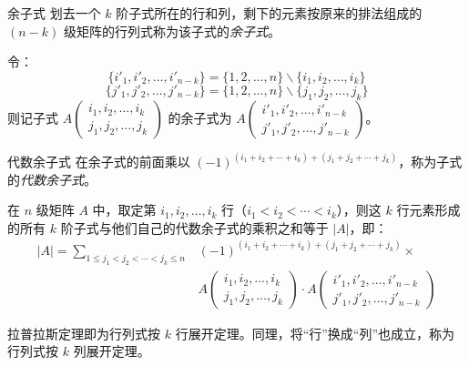\begin{definition}{余子式}
	划去一个 $k$ 阶子式所在的行和列，剩下的元素按原来的排法组成的 $(n - k)$ 级矩阵的行列式称为该子式的\emph{余子式}。

	令：
	$$
	\{ i'_1, i'_2, \ldots, i'_{n - k} \} = \{ 1, 2, \ldots, n \} \backslash \{ i_1, i_2, \ldots, i_k \}
	$$$$
	\{ j'_1, j'_2, \ldots, j'_{n - k} \} = \{ 1, 2, \ldots, n \} \backslash \{ j_1, j_2, \ldots, j_k \}
	$$
	则记子式 $A \begin{pmatrix} i_1, i_2, \ldots, i_k \\ j_1, j_2, \ldots, j_k \end{pmatrix}$ 的余子式为 $A \begin{pmatrix} i'_1, i'_2, \ldots, i'_{n - k} \\ j'_1, j'_2, \ldots, j'_{n - k} \end{pmatrix}$。
\end{definition}

\begin{definition}{代数余子式}
	在余子式的前面乘以 $(-1)^{(i_1 + i_2 + \cdots + i_k) + (j_1 + j_2 + \cdots + j_k)}$，称为子式的\emph{代数余子式}。
\end{definition}

\begin{theorem}[拉普拉斯定理]
	在 $n$ 级矩阵 $A$ 中，取定第 $i_1, i_2, \ldots, i_k$ 行（$i_1 < i_2 < \cdots < i_k$），则这 $k$ 行元素形成的所有 $k$ 阶子式与他们自己的代数余子式的乘积之和等于 $|A|$，即：
	$$
	\begin{aligned}
		|A| = \sum_{1 \le j_1 < j_2 < \cdots < j_k \le n} & (-1)^{(i_1 + i_2 + \cdots + i_k) + (j_1 + j_2 + \cdots + j_k)} \times
		\\&
		A \begin{pmatrix} i_1, i_2, \ldots, i_k \\ j_1, j_2, \ldots, j_k \end{pmatrix} \cdot A \begin{pmatrix} i'_1, i'_2, \ldots, i'_{n - k} \\ j'_1, j'_2, \ldots, j'_{n - k} \end{pmatrix}
	\end{aligned}
	$$
\end{theorem}

拉普拉斯定理即为行列式按 $k$ 行展开定理。同理，将“行”换成“列”也成立，称为行列式按 $k$ 列展开定理。

